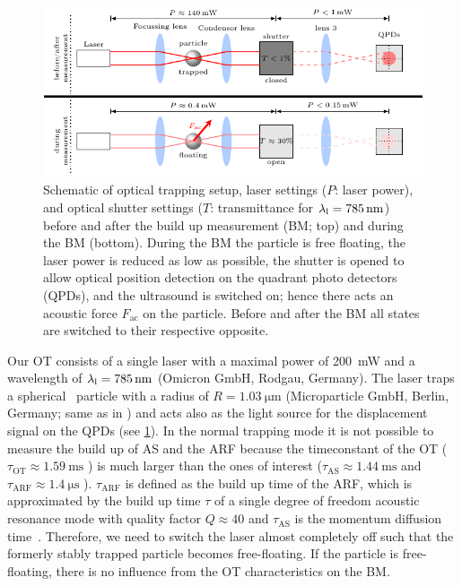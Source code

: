 \begin{figure}[tbp]
  \centering
  \includegraphics[width=\textwidth]{Plots/cache/PU-protocol.pdf}
  \caption{Schematic of optical trapping setup, laser settings ($P$: laser 
    power), and optical shutter settings ($T$: transmittance for $\llaser = 
    \SI{785}{\nm}$) before and after the build up measurement (BM; top) and 
    during the BM (bottom). During the BM the particle is free floating, the 
    laser power is reduced as low as possible, the shutter is opened to allow 
    optical position detection on the quadrant photo detectors (QPDs), and the 
    ultrasound is switched on; hence there acts an acoustic force 
    $F_{\mathrm{ac}}$ on the particle. Before and after the BM all states are 
switched to their respective opposite.}\label{fig:PU-protocol}
\end{figure}

Our OT consists of a single laser with a maximal power of \SI{200}{\milli\watt} 
and a wavelength of $\llaser = \SI{785}{\nm}$ (Omicron GmbH, Rodgau, Germany). 
The laser traps a spherical \SiO~particle with a radius of $R=\SI{1.03}{\um}$ 
(Microparticle GmbH, Berlin, Germany; same as in \cite{Goering2021}) and acts 
also as the light source for the displacement signal on the QPDs (see 
\cref{fig:PU-protocol}). In the normal trapping mode it is not possible to 
measure the build up of AS and the ARF because the timeconstant of the OT 
($\tau_{\mathrm{OT}}\approx \SI{1.59}{\ms}$ \cite{Goering2021}) is much larger 
than the ones of interest ($\tau_{\mathrm{AS}}\approx \SI{1.44}{\ms}$ and 
$\tau_{\mathrm{ARF}}\approx \SI{1.4}{\us}$ \cite{Goering2021}).  
$\tau_{\mathrm{ARF}}$ is defined as the build up time of the ARF, which is 
approximated by the build up time $\tau$ of a single degree of freedom acoustic 
resonance mode with quality factor $Q\approx 40$ and $\tau_{\mathrm{AS}}$ is 
the momentum diffusion time~\cite{Muller2015}. Therefore, we need to switch the 
laser almost completely off such that the formerly stably trapped particle 
becomes free-floating. If the particle is free-floating, there is no influence 
from the OT characteristics on the BM.


